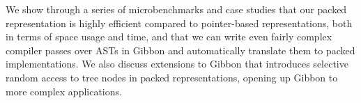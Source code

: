 \documentclass[a4paper,english]{lipics-v2016}
\newcommand{\treelang}{Gibbon\xspace} %
\begin{document}
We show through a series of microbenchmarks and case studies that our packed
representation is highly efficient compared to pointer-based representations,
both in terms of space usage and time, and that we can write even fairly
complex compiler passes over ASTs in \treelang{} and automatically translate
them to packed implementations. We also discuss extensions to \treelang{} that
introduces selective random access to tree nodes in packed representations,
opening up \treelang{} to more complex applications.





% 




\end{document}
